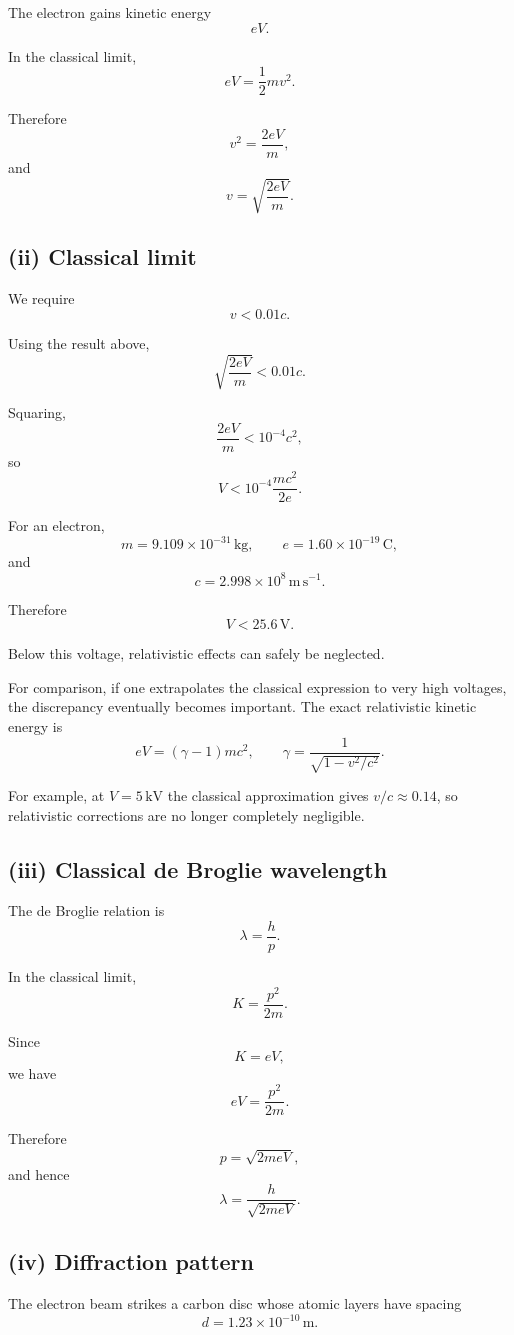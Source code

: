 \documentclass[11pt,a4paper]{article}
\begin{document}
The electron gains kinetic energy
\[
eV.
\]

In the classical limit,
\[
eV=\frac12mv^2.
\]

Therefore
\[
v^2=\frac{2eV}{m},
\]
and
\[
\boxed{v=\sqrt{\frac{2eV}{m}}}.
\]

\subsection{(ii) Classical limit}

We require
\[
v<0.01c.
\]

Using the result above,
\[
\sqrt{\frac{2eV}{m}}<0.01c.
\]

Squaring,
\[
\frac{2eV}{m}<10^{-4}c^2,
\]
so
\[
V<
10^{-4}\frac{mc^2}{2e}.
\]

For an electron,
\[
m=9.109\times10^{-31}\,\mathrm{kg},
\qquad
e=1.60\times10^{-19}\,\mathrm C,
\]
and
\[
c=2.998\times10^8\,\mathrm{m\,s^{-1}}.
\]

Therefore
\[
\boxed{V<25.6\,\mathrm V}.
\]

Below this voltage, relativistic effects can safely be neglected.

For comparison, if one extrapolates the classical expression to very high voltages,
the discrepancy eventually becomes important. The exact relativistic kinetic energy is
\[
eV=(\gamma-1)mc^2,
\qquad
\gamma=\frac{1}{\sqrt{1-v^2/c^2}}.
\]

For example, at $V=5\,\mathrm{kV}$ the classical approximation gives
$v/c\approx0.14$, so relativistic corrections are no longer completely negligible.

\subsection{(iii) Classical de Broglie wavelength}

The de Broglie relation is
\[
\lambda=\frac{h}{p}.
\]

In the classical limit,
\[
K=\frac{p^2}{2m}.
\]

Since
\[
K=eV,
\]
we have
\[
eV=\frac{p^2}{2m}.
\]

Therefore
\[
p=\sqrt{2meV},
\]
and hence
\[
\boxed{
\lambda=\frac{h}{\sqrt{2meV}}
}.
\]

\subsection{(iv) Diffraction pattern}

The electron beam strikes a carbon disc whose atomic layers have spacing
\[
d=1.23\times10^{-10}\,\mathrm m.
\]
\end{document}
